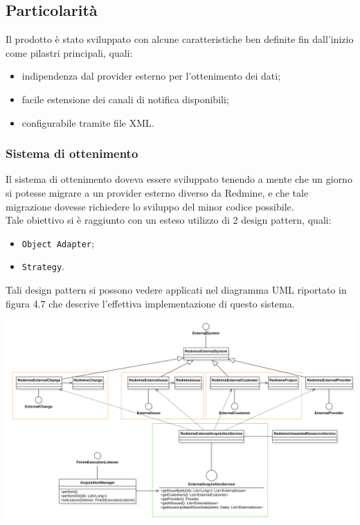 	\subsection{Particolarità }
		Il prodotto è stato sviluppato con alcune caratteristiche ben definite fin dall'inizio come pilastri principali, quali:
		\begin{itemize}
			\item indipendenza dal provider esterno per l'ottenimento dei dati;
			\item facile estensione dei canali di notifica disponibili;
			\item configurabile tramite file XML.
		\end{itemize}
		\subsubsection{Sistema di ottenimento}
			Il sistema di ottenimento doveva essere sviluppato tenendo a mente che un giorno si potesse migrare a un provider esterno diverso da Redmine, e che tale migrazione dovesse richiedere lo sviluppo del minor codice possibile. \\
			Tale obiettivo si è raggiunto con un esteso utilizzo di 2 design pattern, quali:
			\begin{itemize}
				\item \texttt{Object Adapter};
				\item \texttt{Strategy}.
			\end{itemize}
			Tali design pattern si possono vedere applicati nel diagramma UML riportato in figura 4.7 che descrive l'effettiva implementazione di questo sistema.
   			\begin{center}
				\includegraphics[keepaspectratio = true, width=16cm]{immagini/ottenimento.png}
			\end{center}
